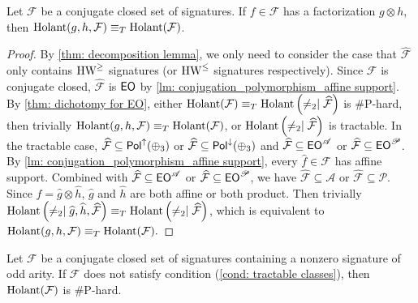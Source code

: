 \begin{lemma}\label{lm: decomposition}
    Let $\mathcal{F}$ be a conjugate closed set of signatures.
    If $f\in \mathcal{F}$ has a factorization $g\otimes h$, then $\operatorname{Holant}(g, h, \mathcal{F})\equiv_T\operatorname{Holant}( \mathcal{F})$.
\end{lemma}

\begin{proof}
    By \cref{thm: decomposition lemma}, we only need to consider the case that $\widehat{\mathcal{F}}$ only contains $\text{HW}^\geq$ signatures (or $\text{HW}^\leq$ signatures respectively).
    Since $\mathcal{F}$ is conjugate closed, $\widehat{\mathcal{F}}$ is $\textup{\textsf{EO}}$ by \cref{lm: conjugation_polymorphism_affine support}.
    By \cref{thm: dichotomy for EO}, either $\operatorname{Holant}(\mathcal{F})\equiv_T\operatorname{Holant}\left(\neq_2\mid \widehat{\mathcal{F}}\right)$ is \#P-hard, then trivially $\operatorname{Holant}(g,h,\mathcal{F})\equiv_T\operatorname{Holant}(\mathcal{F})$, or $\operatorname{Holant}\left(\neq_2\mid \widehat{\mathcal{F}}\right)$ is tractable.
    In the tractable case, $\widehat{\mathcal{F}}\subseteq \mathsf{Pol}^\uparrow(\oplus_3)$ or $\widehat{\mathcal{F}}\subseteq \mathsf{Pol}^\downarrow(\oplus_3)$ and $\widehat{\mathcal{F}}\subseteq \textup{\textsf{EO}}^{\mathscr{A}}$ or $\widehat{\mathcal{F}}\subseteq \textup{\textsf{EO}}^{\mathscr{P}}$.
    By \cref{lm: conjugation_polymorphism_affine support}, every $\widehat{f}\in \mathcal{F}$ has affine support.
    Combined with $\widehat{\mathcal{F}}\subseteq \textup{\textsf{EO}}^{\mathscr{A}}$ or $\widehat{\mathcal{F}}\subseteq \textup{\textsf{EO}}^{\mathscr{P}}$, we have $\widehat{\mathcal{F}}\subseteq \mathscr{A}$ or $\widehat{\mathcal{F}}\subseteq\mathscr{P}$.
    Since $\widehat{f}=\widehat{g}\otimes\widehat{h}$, $\widehat{g}$ and $\widehat{h}$ are both affine or both product.
    Then trivially $\operatorname{Holant}\left(\neq_2\mid \widehat{g},\widehat{h},\widehat{\mathcal{F}}\right)\equiv_T \operatorname{Holant}\left(\neq_2\mid \widehat{\mathcal{F}}\right)$, which is equivalent to $\operatorname{Holant}(g, h, \mathcal{F})\equiv_T\operatorname{Holant}( \mathcal{F}).$ 
\end{proof}



\begin{lemma}\label{lm: odd holant with conjugation}
    Let $\mathcal{F}$ be a conjugate closed set of signatures containing a nonzero signature of odd arity.
    If $\mathcal{F}$ does not satisfy condition \rm{(\ref{cond: tractable classes})},
    then $\operatorname{Holant}(\mathcal{F})$ is \#P-hard.
\end{lemma}



